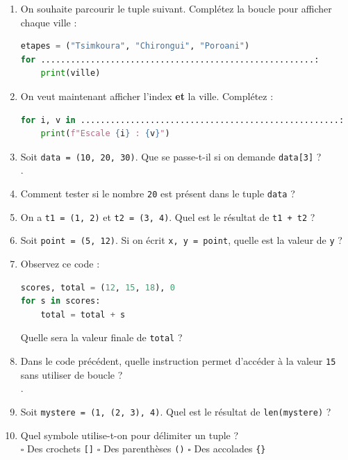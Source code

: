 \begin{Exercise}[title={Maîtrise des Tuples : Les fondamentaux }]
\begin{enumerate}
    \item  On souhaite parcourir le tuple suivant. Complétez la boucle pour afficher chaque ville :
            \begin{lstlisting}[style=pythonstyle, language=Python]
etapes = ("Tsimkoura", "Chirongui", "Poroani")
for .......................................................:
    print(ville)
\end{lstlisting}

    \item  On veut maintenant afficher l'index \textbf{et} la ville. Complétez :
            \begin{lstlisting}[style=pythonstyle, language=Python]
for i, v in ....................................................:
    print(f"Escale {i} : {v}")
\end{lstlisting}
    \item  Soit \texttt{data = (10, 20, 30)}. Que se passe-t-il si on demande \texttt{data[3]} ? \\
    .\dotfill

    \item  Comment tester si le nombre \texttt{20} est présent dans le tuple \texttt{data} ? \dotfill

    \item  On a \texttt{t1 = (1, 2)} et \texttt{t2 = (3, 4)}. Quel est le résultat de \texttt{t1 + t2} ? \dotfill

    \item  Soit \texttt{point = (5, 12)}. Si on écrit \texttt{x, y = point}, quelle est la valeur de \texttt{y} ? \dotfill

    \item  Observez ce code :
\begin{lstlisting}[style=pythonstyle, language=Python]
scores, total = (12, 15, 18), 0
for s in scores:
    total = total + s
\end{lstlisting}
    Quelle sera la valeur finale de \texttt{total} ? \dotfill

    \item  Dans le code précédent, quelle instruction permet d'accéder à la valeur \texttt{15} sans utiliser de boucle ? \\.\dotfill

    \item  Soit \texttt{mystere = (1, (2, 3), 4)}. Quel est le résultat de \texttt{len(mystere)} ? \dotfill

    \item  Quel symbole utilise-t-on pour délimiter un tuple ? \\
    \hfill $\square$ Des crochets \texttt{[]} \hfill $\square$ Des parenthèses \texttt{()} \hfill $\square$ Des accolades \texttt{\{\}} \hfill


\end{enumerate}
\end{Exercise}
